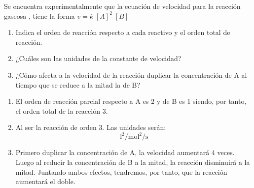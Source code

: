 \begin{exerciseEVAU}
    Se encuentra experimentalmente que la ecuación de velocidad para la reacción gaseosa , tiene la forma $v = k\; [A]^2\; [B]$
    \begin{enumerate}[label=\letraminuscula]
        \item Indica el orden de reacción respecto a cada reactivo y el orden total de reacción.
        \item ¿Cuáles son las unidades de la constante de velocidad?
        \item ¿Cómo afecta a la velocidad de la reacción duplicar la concentración de A al tiempo que se reduce a la mitad la de B?
    \end{enumerate}
    \begin{solu}
        \begin{enumerate}[label=\letraminuscula]
            \item El orden de reacción parcial respecto a A es $2$ y de B es $1$ siendo, por tanto, el orden total de la reacción $3$.
            \item Al ser la reacción de orden $3$.
            Las unidades serán:
            \begin{equation}
                \si{\square\litre\per\square\mole\per\s}
            \end{equation}
            \item  Primero duplicar la concentración de A, la velocidad aumentará 4 veces.
            Luego al reducir la concentración de B a la mitad, la reacción disminuirá a la mitad.
            Juntando ambos efectos, tendremos, por tanto, que la reacción aumentará el doble.
        \end{enumerate}
    \end{solu}
\end{exerciseEVAU}

